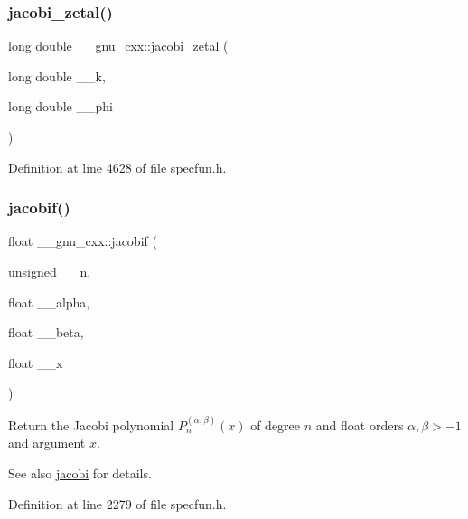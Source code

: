 \subsubsection{\texorpdfstring{jacobi\+\_\+zetal()}{jacobi\_zetal()}}
{\footnotesize\ttfamily long double \+\_\+\+\_\+gnu\+\_\+cxx\+::jacobi\+\_\+zetal (\begin{DoxyParamCaption}\item[{long double}]{\+\_\+\+\_\+k,  }\item[{long double}]{\+\_\+\+\_\+phi }\end{DoxyParamCaption})\hspace{0.3cm}{\ttfamily [inline]}}



Definition at line 4628 of file specfun.\+h.

\mbox{\label{group__gnu__math__spec__func_ga450db12e06d6993d169afab5b3f6d0b8}} 
\subsubsection{\texorpdfstring{jacobif()}{jacobif()}}
{\footnotesize\ttfamily float \+\_\+\+\_\+gnu\+\_\+cxx\+::jacobif (\begin{DoxyParamCaption}\item[{unsigned}]{\+\_\+\+\_\+n,  }\item[{float}]{\+\_\+\+\_\+alpha,  }\item[{float}]{\+\_\+\+\_\+beta,  }\item[{float}]{\+\_\+\+\_\+x }\end{DoxyParamCaption})\hspace{0.3cm}{\ttfamily [inline]}}

Return the Jacobi polynomial $ P_n^{(\alpha,\beta)}(x) $ of degree $ n $ and {\ttfamily float} orders $ \alpha, \beta > -1 $ and argument $ x $.

\begin{DoxySeeAlso}{See also}
\hyperlink{group__gnu__math__spec__func_gad54f6601748324d268532138eb38ca33}{jacobi} for details. 
\end{DoxySeeAlso}


Definition at line 2279 of file specfun.\+h.



